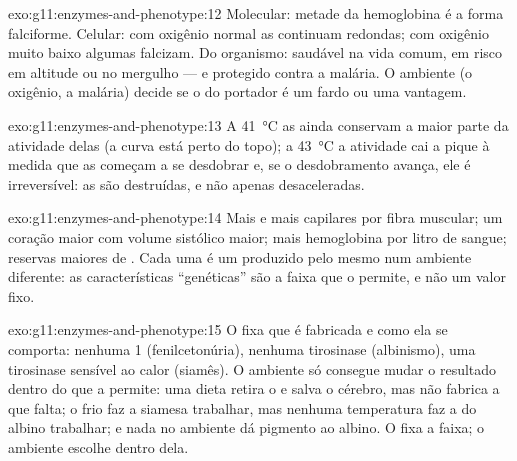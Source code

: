\begin{solution}{exo:g11:enzymes-and-phenotype:12}
Molecular: metade da hemoglobina é a forma falciforme. Celular: com
oxigênio normal as  continuam redondas; com oxigênio muito baixo
algumas falcizam. Do organismo: saudável na vida comum, em risco em
altitude ou no mergulho --- e protegido contra a malária. O ambiente (o
oxigênio, a malária) decide se o  do portador é um fardo ou uma
vantagem.
\end{solution}

\begin{solution}{exo:g11:enzymes-and-phenotype:13}
A \qty{41}{\celsius} as  ainda conservam a maior parte da
atividade delas (a curva está perto do topo); a \qty{43}{\celsius} a
atividade cai a pique à medida que as  começam a se desdobrar
e, se o desdobramento avança, ele é irreversível: as  são
destruídas, e não apenas desaceleradas.
\end{solution}

\begin{solution}{exo:g11:enzymes-and-phenotype:14}
Mais  e mais capilares por fibra muscular; um coração maior
com volume sistólico maior; mais hemoglobina por litro de sangue;
reservas maiores de . Cada uma é um  produzido pelo
mesmo  num ambiente diferente: as características
``genéticas'' são a faixa que o  permite, e não um valor fixo.
\end{solution}

\begin{solution}{exo:g11:enzymes-and-phenotype:15}
O  fixa que  é fabricada e como ela se comporta: nenhuma
 1 (fenilcetonúria), nenhuma tirosinase (albinismo), uma
tirosinase sensível ao calor (siamês). O ambiente só consegue mudar o
resultado dentro do que a  permite: uma dieta retira o 
e salva o cérebro, mas não fabrica a  que falta; o frio faz a
 siamesa trabalhar, mas nenhuma temperatura faz a do albino
trabalhar; e nada no ambiente dá pigmento ao albino. O  fixa a
faixa; o ambiente escolhe dentro dela.
\end{solution}

